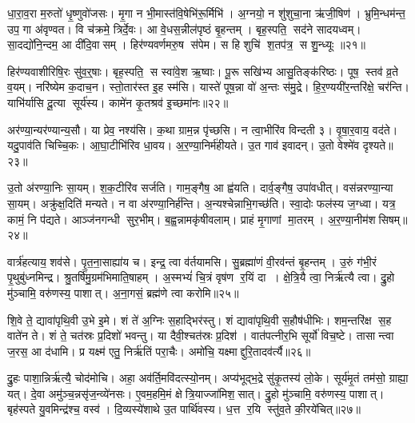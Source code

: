 धा॒रा॒व॒रा म॒रुतो॑ धृ॒ष्णुवो॑जसः। मृ॒गा न भी॒मास्त॑वि॒षेभि॑रू॒र्मिभि॑। अ॒ग्नयो॒ न शु॑शुचा॒ना ऋ॑जी॒षिण॑। भ्रुमि॒न्धम॑न्त॒ उप॒ गा अ॑वृण्वत। वि च॑क्रमे॒ त्रिर्दे॒वः। आ वे॒धस॒न्नील॑पृष्ठं बृ॒हन्तम्। बृह॒स्पति॒ सद॑ने सादयध्वम्। सा॒दद्यो॑नि॒न्दम॒ आ दी॑दि॒वासम्। हिर॑ण्यवर्णमरु॒ष स॑पेम। स हि शुचि॑ श॒तप॑त्र॒ स शु॒न्ध्यूः ॥२१॥

हिर॑ण्यवाशीरिषि॒रः सु॑व॒र्॒षाः। बृह॒स्पति॒ स स्वा॑वे॒श ऋ॒ष्वाः। पू॒रू सखि॑भ्य आसु॒तिङ्क॑रिष्ठः। पूष॒ स्तव॑ व्र॒ते व॒यम्। नरि॑ष्येम क॒दाच॒न। स्तो॒तार॑स्त इ॒ह स्म॑सि। यास्ते॑ पूष॒न्ना वो॑ अ॒न्तः स॑मु॒द्रे। हि॒र॒ण्ययी॑र॒न्तरि॑क्षे॒ चर॑न्ति। याभि॑र्यासि दू॒त्या सूर्य॑स्य। कामे॑न कृ॒तश्रव॑ इ॒च्छमा॑नः॥२२॥

अर॑ण्या॒न्यर॑ण्यान्य॒सौ। या प्रेव॒ नश्य॑सि। क॒था ग्राम॒न्न पृ॑च्छसि। न त्वा॒भीरि॑व विन्दती ३। वृ॒षा॒र॒वाय॒ वद॑ते। यदु॒पाव॑ति चिच्चि॒कः। आ॒घा॒टीभि॑रिव धा॒वय\sn{}। अ॒र॒ण्या॒निर्म॑हीयते। उ॒त गाव॑ इवादन्। उ॒तो वेश्मे॑व दृश्यते॥२३॥

उ॒तो अ॑रण्या॒निः सा॒यम्। श॒क॒टीरि॑व सर्जति। गाम॒ङ्गैष॒ आ ह्व॑यति। दार्व॒ङ्गैष॒ उपा॑वधीत्। वस॑न्नरण्या॒न्या सा॒यम्। अक्रु॑क्ष॒दिति॑ मन्यते। न वा अ॑रण्या॒निर्\mbox{}ह॑न्ति। अ॒न्यश्चेन्नाभि॒गच्छ॑ति। स्वा॒दोः फल॑स्य ज॒ग्ध्वा। यत्र॒ कामं॒ नि प॑द्यते। आञ्ज॑नगन्धी सुर॒भीम्। ब॒ह्व॒न्नामकृ॑षीवलाम्। प्राहं मृ॒गाणां मा॒तरम्। अ॒र॒ण्या॒नीम॑शसिषम्॥२४॥\anuvakamend[स्या॒म॒ रु॒रो॒ह॒ यु॒वा॒न॒ शु॒न्ध्यूरि॒च्छमा॑नो दृश्यते॒ निप॑द्यते च॒त्वारि॑ च]

वार्त्र॑हत्याय॒ शव॑से। पृ॒त॒ना॒साह्या॑य च। इन्द्र॒ त्वा व॑र्तयामसि। सु॒ब्रह्मा॑णं वी॒रव॑न्तं बृ॒हन्तम्। उ॒रुं ग॑भी॒रं पृ॒थुबु॑ध्नमिन्द्र। श्रु॒तर्\mbox{}षि॑मु॒ग्रम॑भिमाति॒षाहम्। अ॒स्मभ्यं॑ चि॒त्रं वृष॑ण र॒यिं दा। क्षे॒त्रि॒यै त्वा॒ निर्\mbox{}ऋ॑त्यै त्वा। द्रु॒हो मु॑ञ्चामि॒ वरु॑णस्य॒ पाशात्। अ॒ना॒गसं॒ ब्रह्म॑णे त्वा करोमि॥२५॥

शि॒वे ते॒ द्यावा॑पृथि॒वी उ॒भे इ॒मे। शं ते॑ अ॒ग्निः स॒हाद्भिर॑स्तु। शं द्यावा॑पृथि॒वी स॒हौष॑धीभिः। शम॒न्तरि॑क्ष स॒ह वाते॑न ते। शं ते॒ चत॑स्रः प्र॒दिशो॑ भवन्तु। या दैवी॒श्चत॑स्रः प्र॒दिश॑। वात॑पत्नीर॒भि सूर्यो॑ विच॒ष्टे। तासान्त्वा ज॒रस॒ आ द॑धामि। प्र यक्ष्म॑ एतु॒ निर्\mbox{}ऋ॑तिं परा॒चैः। अमो॑चि॒ यक्ष्माद्दुरि॒तादव॑र्त्यै॥२६॥

द्रु॒हः पाशा॒न्निर्\mbox{}ऋ॑त्यै॒ चोद॑मोचि। अहा॒ अव॑र्ति॒मवि॑दत्स्यो॒नम्। अप्य॑भूद्भ॒द्रे सु॑कृ॒तस्य॑ लो॒के। सूर्य॑मृ॒तं तम॑सो॒ ग्राह्या॒ यत्। दे॒वा अमु॑ञ्च॒न्नसृ॑ज॒न्व्ये॑नसः। ए॒वम॒हमि॒मं क्षेत्रि॒याज्जा॑मिश॒सात्। द्रु॒हो मु॑ञ्चामि॒ वरु॑णस्य॒ पाशात्। बृह॑स्पते यु॒वमिन्द्र॑श्च॒ वस्व॑। दि॒व्यस्ये॑शाथे उ॒त पार्थि॑वस्य। ध॒त्त र॒यि स्तु॑व॒ते की॒रये॑चित्॥२७॥

